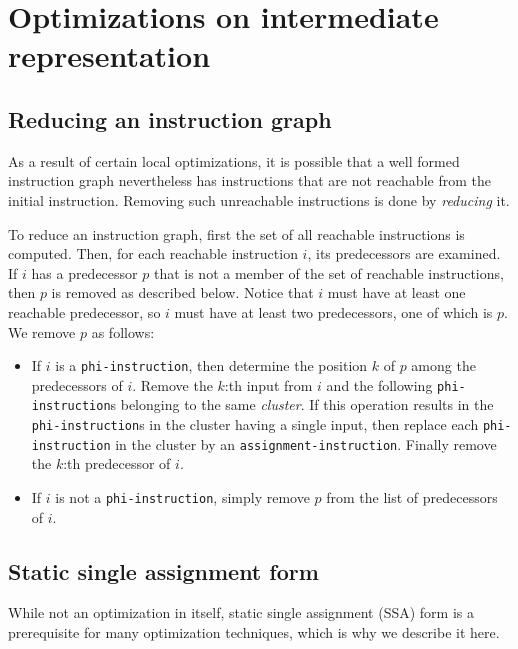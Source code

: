 \chapter{Optimizations on intermediate representation}

\section{Reducing an instruction graph}
\label{mir-optimizations-reduction}

As a result of certain local optimizations, it is possible that a well
formed instruction graph nevertheless has instructions that are not
reachable from the initial instruction.  Removing such unreachable
instructions is done by \emph{reducing} it.

To reduce an instruction graph, first the set of all reachable
instructions is computed.  Then, for each reachable instruction $i$,
its predecessors are examined.  If $i$ has a predecessor $p$ that is
not a member of the set of reachable instructions, then $p$ is removed
as described below.  Notice that $i$ must have at least one reachable
predecessor, so $i$ must have at least two predecessors, one of which
is $p$.  We remove $p$ as follows:

\begin{itemize}
\item If $i$ is a \texttt{phi-instruction}, then determine the
  position $k$ of $p$ among the predecessors of $i$.  Remove the
  $k$:th input from $i$ and the following \texttt{phi-instruction}s
  belonging to the same \emph{cluster}.  If this operation results in
  the \texttt{phi-instruction}s in the cluster having a single input,
  then replace each \texttt{phi-instruction} in the cluster by an
  \texttt{assignment-instruction}.  Finally remove the $k$:th
  predecessor of $i$.
\item If $i$ is not a \texttt{phi-instruction}, simply remove $p$ from
  the list of predecessors of $i$.
\end{itemize}

\section{Static single assignment form}
\label{mir-optimizations-ssa-form}

While not an optimization in itself, static single assignment (SSA)
form is a prerequisite for many optimization techniques, which is why
we describe it here. 


